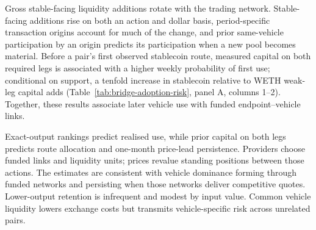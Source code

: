 Gross stable-facing liquidity additions rotate with the trading network. Stable-facing additions rise on both an action and dollar basis, period-specific transaction origins account for much of the change, and prior same-vehicle participation by an origin predicts its participation when a new pool becomes material. Before a pair's first observed stablecoin route, measured capital on both required legs is associated with a \BridgeAdoptionRiskAnySupport{} higher weekly probability of first use; conditional on support, a tenfold increase in stablecoin relative to WETH weak-leg capital adds \BridgeAdoptionRiskIntensiveTenfold{} (Table~\ref{tab:bridge-adoption-risk}, panel A, columns 1--2). Together, these results associate later vehicle use with funded endpoint--vehicle links.

Exact-output rankings predict realised use, while prior capital on both legs predicts route allocation and one-month price-lead persistence. Providers choose funded links and liquidity units; prices revalue standing positions between those actions. The estimates are consistent with vehicle dominance forming through funded networks and persisting when those networks deliver competitive quotes. Lower-output retention is infrequent and modest by input value. Common vehicle liquidity lowers exchange costs but transmits vehicle-specific risk across unrelated pairs.
